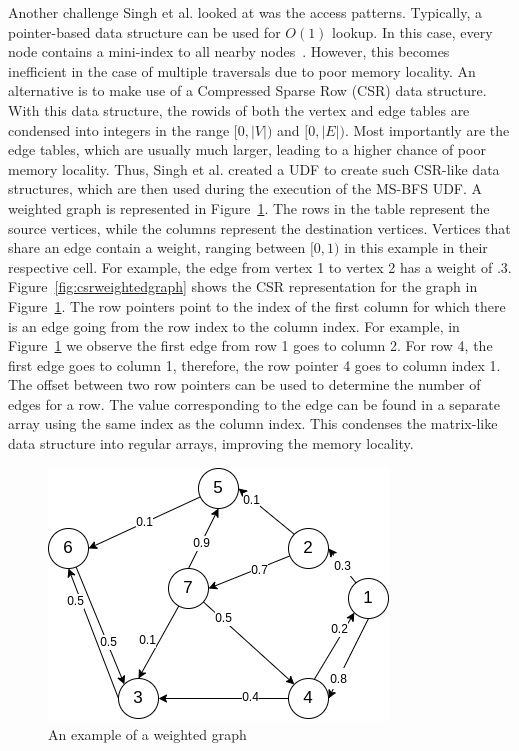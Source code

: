 Another challenge Singh et al. looked at was the access patterns. 
Typically, a pointer-based data structure can be used for $O(1)$ lookup. 
In this case, every node contains a mini-index to all nearby nodes~\cite{indexfreeadjacency}. 
However, this becomes inefficient in the case of multiple traversals due to poor memory locality. 
An alternative is to make use of a Compressed Sparse Row (CSR) data structure.
With this data structure, the rowids of both the vertex and edge tables are condensed into integers in the range  $[0, |V|)$ and $[0, |E|)$.  
Most importantly are the edge tables, which are usually much larger, leading to a higher chance of poor memory locality. 
Thus, Singh et al. created a UDF to create such CSR-like data structures, which are then used during the execution of the MS-BFS UDF.
A weighted graph is represented in Figure~\ref{fig:weightedgraph}.
The rows in the table represent the source vertices, while the columns represent the destination vertices. 
Vertices that share an edge contain a weight, ranging between $[0, 1)$ in this example in their respective cell. 
For example, the edge from vertex 1 to vertex 2 has a weight of $.3$.
Figure~\ref{fig:csrweightedgraph} shows the CSR representation for the graph in Figure~\ref{fig:weightedgraph}. 
The row pointers point to the index of the first column for which there is an edge going from the row index to the column index. 
For example, in Figure~\ref{fig:weightedgraph} we observe the first edge from row 1 goes to column 2. 
For row 4, the first edge goes to column 1, therefore, the row pointer 4 goes to column index 1. 
The offset between two row pointers can be used to determine the number of edges for a row.
The value corresponding to the edge can be found in a separate array using the same index as the column index.
This condenses the matrix-like data structure into regular arrays, improving the memory locality. 

\begin{figure}
  \includegraphics[width=0.6\linewidth]{figures/CSR diagrams.drawio.png}
  \caption{An example of a weighted graph}
  \label{fig:weightedgraph}
\end{figure}


